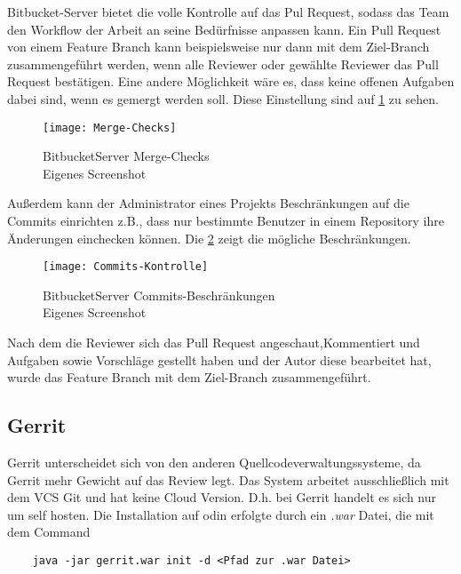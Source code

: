 Bitbucket-Server bietet die volle Kontrolle auf das Pul Request, sodass das Team den Workflow der Arbeit an seine Bedürfnisse anpassen kann. Ein Pull Request von einem Feature Branch kann beispielsweise nur dann mit dem Ziel-Branch zusammengeführt werden, wenn alle Reviewer oder gewählte Reviewer das Pull Request bestätigen. Eine andere Möglichkeit wäre es, dass keine offenen Aufgaben dabei sind, wenn es gemergt werden soll. Diese Einstellung sind auf \cref{fig:BitbucketServer Merge-Checks} zu sehen.
\begin{figure}[H]
	\centering
	\texttt{[image: Merge-Checks]}
	\caption[BitbucketServer Merge-Checks]{BitbucketServer Merge-Checks\\Eigenes Screenshot}
	\label{fig:BitbucketServer Merge-Checks}
\end{figure}

Außerdem kann der Administrator eines Projekts Beschränkungen auf die Commits einrichten z.B., dass nur bestimmte Benutzer in einem Repository ihre Änderungen einchecken können. Die \ref{fig:BitbucketServer Commits-Kontrolle} zeigt die mögliche Beschränkungen.

\begin{figure}[H]
	\centering
	\texttt{[image: Commits-Kontrolle]}
	\caption[BitbucketServer Commits-Beschränkungen]{BitbucketServer Commits-Beschränkungen\\Eigenes Screenshot}
	\label{fig:BitbucketServer Commits-Kontrolle}
\end{figure}

Nach dem die Reviewer sich das Pull Request angeschaut,Kommentiert und Aufgaben sowie Vorschläge gestellt haben und der Autor diese bearbeitet hat, wurde das Feature Branch mit dem Ziel-Branch zusammengeführt.

\subsection{Gerrit}
\label{subsubsec:Test_Gerrit}

Gerrit unterscheidet sich von den anderen Quellcodeverwaltungssysteme, da Gerrit mehr Gewicht auf das Review legt. Das System arbeitet ausschließlich mit dem \ac{VCS} Git und hat keine Cloud Version. D.h. bei Gerrit handelt es sich nur um self hosten. Die Installation auf odin erfolgte durch ein \textit{.war} Datei, die mit dem Command

{\color{blue}
\begin{verbatim}
	java -jar gerrit.war init -d <Pfad zur .war Datei> 
\end{verbatim}}

